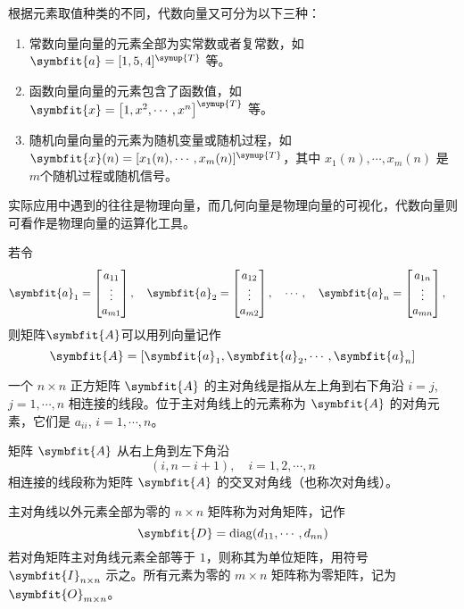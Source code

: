 \documentclass[punct=kaiming, fontset=sikou]{ctexbook}
\numberwithin{equation}{section}
\def\TT{\symup{T}}
\def\bf#1{\symbfit{#1}}
\def\hccwd{\hspace*{\ccwd}}
\DeclareMathOperator{\diag}{diag}
\begin{document}
  根据元素取值种类的不同，代数向量又可分为以下三种：
  \begin{enumerate}
    \item {\fangsong 常数向量}\hccwd 向量的元素全部为实常数或者复常数，如 $\bf{a}=[1,\allowbreak 5,\allowbreak 4]^{\TT}$ 等。
    \item {\fangsong 函数向量}\hccwd 向量的元素包含了函数值，如 $\bf{x} = \bigl[ 1,\allowbreak x^2,\allowbreak\cdots,\allowbreak x^n \bigr]^{\TT}$ 等。
    \item {\fangsong 随机向量}\hccwd 向量的元素为随机变量或随机过程，如 $\bf{x}(n) = [x_1(n),\allowbreak \cdots,\allowbreak x_m(n)]^{\TT}$，其中 $x_1(n),\allowbreak\cdots,\allowbreak x_m(n)$ 是$m$个随机过程或随机信号。
  \end{enumerate}

  实际应用中遇到的往往是物理向量，而几何向量是物理向量的可视化，代数向量则可看作是物理向量的运算化工具。

  若令
  \begin{equation}
    \bf{a}_1 = \begin{bmatrix}
      a_{11} \\ \vdots \\ a_{m1}
    \end{bmatrix},\quad
    \bf{a}_2 = \begin{bmatrix}
      a_{12} \\ \vdots \\ a_{m2}
    \end{bmatrix},\quad
    \cdots,\quad
    \bf{a}_n = \begin{bmatrix}
      a_{1n} \\ \vdots \\ a_{mn}
    \end{bmatrix},\quad
  \end{equation}
  则矩阵$\bf{A}$可以用列向量记作
  \begin{equation}
    \bf{A} = [\bf{a}_1,\bf{a}_2,\cdots,\bf{a}_n]
  \end{equation}

  一个 $n\times n$ 正方矩阵 $\bf{A}$ 的主对角线是指从左上角到右下角沿 $i=j$, $j=1,\allowbreak \cdots,\allowbreak n$ 相连接的线段。位于主对角线上的元素称为 $\bf{A}$ 的对角元素，它们是 $a_{ii}$, $i=1,\allowbreak\cdots,\allowbreak n$。

  矩阵 $\bf{A}$ 从右上角到左下角沿
  \[ (i,n-i+1),\quad i=1,2,\cdots,n \]
  相连接的线段称为矩阵 $\bf{A}$ 的交叉对角线（也称次对角线）。

  主对角线以外元素全部为零的 $n\times n$ 矩阵称为对角矩阵，记作
  \begin{equation}
    \bf{D} = \diag(d_{11},\cdots,d_{nn})
  \end{equation}
  若对角矩阵主对角线元素全部等于 $1$，则称其为单位矩阵，用符号 $\bf{I}_{n \times n}$ 示之。所有元素为零的 $m\times n$ 矩阵称为零矩阵，记为 $\bf{O}_{m \times n}$。
\end{document}

